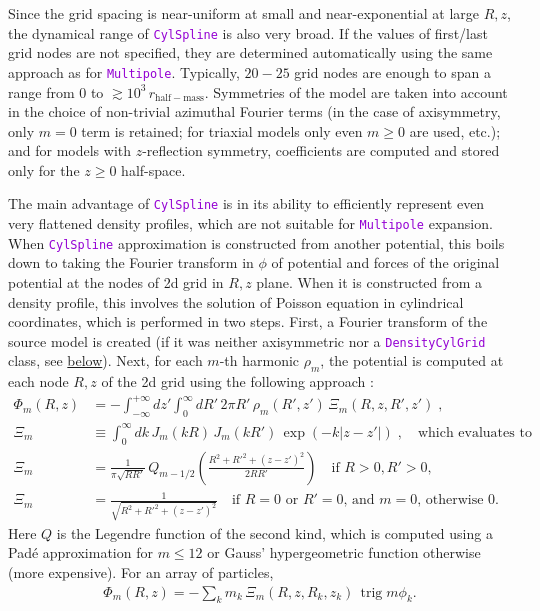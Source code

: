 \documentclass[12pt]{article}
\newcommand{\ttt}[1]{\textcolor{darkviolet}{\texttt{#1}}}
\DeclareMathOperator{\trig}{trig}
\begin{document}
Since the grid spacing is near-uniform at small and near-exponential at large $R,z$, the dynamical range of \ttt{CylSpline} is also very broad. If the values of first/last grid nodes are not specified, they are determined automatically using the same approach as for \ttt{Multipole}. Typically, $20-25$ grid nodes are enough to span a range from 0 to $\gtrsim 10^3\,r_\mathrm{half-mass}$.
Symmetries of the model are taken into account in the choice of non-trivial azimuthal Fourier terms (in the case of axisymmetry, only $m=0$ term is retained; for triaxial models only even $m\ge 0$ are used, etc.); and for models with $z$-reflection symmetry, coefficients are computed and stored only for the $z\ge 0$ half-space.

The main advantage of \ttt{CylSpline} is in its ability to efficiently represent even very flattened density profiles, which are not suitable for \ttt{Multipole} expansion. When \ttt{CylSpline} approximation is constructed from another potential, this boils down to taking the Fourier transform in $\phi$ of potential and forces of the original potential at the nodes of 2d grid in $R,z$ plane. When it is constructed from a density profile, this involves the solution of Poisson equation in cylindrical coordinates, which is performed in two steps. First, a Fourier transform of the source model is created (if it was neither axisymmetric nor a \ttt{DensityCylGrid} class, see \hyperref[sec:DensityCylGrid]{below}). Next, for each $m$-th harmonic $\rho_m$, the potential is computed at each node $R,z$ of the 2d grid using the following approach \cite{CohlTohline1999}:
\begin{align}
\Phi_m(R,z) &= -\int_{-\infty}^{+\infty} dz' \int_0^{\infty} dR' \,2\pi R'\,\rho_m(R',z')  
  \,\Xi_m(R,z,R',z')\;,  \label{eq:PoissonCylindric} \\
\Xi_m &\equiv \int_0^\infty dk\, J_m(kR)\, J_m(kR')\, \exp(-k|z-z'|) \;,\quad
  \mbox{which evaluates to} \\
\Xi_m&= \frac{1}{\pi\sqrt{RR'}}\, Q_{m-1/2}\left( \frac{R^2+R'^2+(z-z')^2}{2RR'} \right) \quad
  \mbox{if }R>0,R'>0,  \nonumber \\
\Xi_m&= \frac{1}{\sqrt{R^2+R'^2+(z-z')^2}}\quad
  \mbox{if }R=0\mbox{ or }R'=0\mbox{, and }m=0\mbox{, otherwise 0}. \nonumber
\end{align}
Here $Q$ is the Legendre function of the second kind, which is computed using a Pad\'e approximation for $m\le 12$ or Gauss' hypergeometric function otherwise (more expensive).
For an array of particles, 
\begin{align}  \label{eq:PoissonCylindricParticles}
\Phi_m(R,z) = -\sum_k m_k\,\Xi_m(R,z,R_k,z_k)\,\trig m\phi_k .
\end{align}
\end{document}
